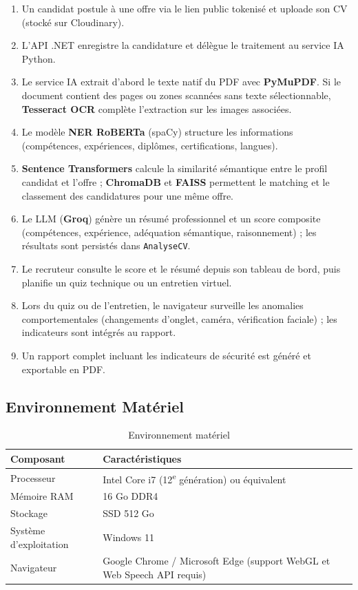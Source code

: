 \begin{enumerate}
    \item Un candidat postule à une offre via le lien public tokenisé et uploade son CV
    (stocké sur Cloudinary).
    \item L'API .NET enregistre la candidature et délègue le traitement au service IA Python.
    \item Le service IA extrait d'abord le texte natif du PDF avec \textbf{PyMuPDF}. Si le
    document contient des pages ou zones scannées sans texte sélectionnable, \textbf{Tesseract OCR}
    complète l'extraction sur les images associées.
    \item Le modèle \textbf{NER RoBERTa} (spaCy) structure les informations (compétences,
    expériences, diplômes, certifications, langues).
    \item \textbf{Sentence Transformers} calcule la similarité sémantique entre le profil
    candidat et l'offre ; \textbf{ChromaDB} et \textbf{FAISS} permettent le matching
    et le classement des candidatures pour une même offre.
    \item Le LLM (\textbf{Groq}) génère un résumé professionnel et un score composite
    (compétences, expérience, adéquation sémantique, raisonnement) ; les résultats sont
    persistés dans \texttt{AnalyseCV}.
    \item Le recruteur consulte le score et le résumé depuis son tableau de bord, puis
    planifie un quiz technique ou un entretien virtuel.
    \item Lors du quiz ou de l'entretien, le navigateur surveille les anomalies comportementales
    (changements d'onglet, caméra, vérification faciale) ; les indicateurs sont intégrés au rapport.
    \item Un rapport complet incluant les indicateurs de sécurité est généré et exportable en PDF.
\end{enumerate}

\subsection{Environnement Matériel}

\begin{table}[h]
\centering
\renewcommand{\arraystretch}{1.5}
\begin{tabular}{|p{4cm}|p{9cm}|}
\hline
\textbf{Composant} & \textbf{Caractéristiques} \\
\hline
Processeur & Intel Core i7 (12\textsuperscript{e} génération) ou équivalent \\
\hline
Mémoire RAM & 16 Go DDR4 \\
\hline
Stockage & SSD 512 Go \\
\hline
Système d'exploitation & Windows 11 \\
\hline
Navigateur & Google Chrome / Microsoft Edge (support WebGL et Web Speech API requis) \\
\hline
\end{tabular}
\caption{Environnement matériel}
\label{tab:materiel}
\end{table}

